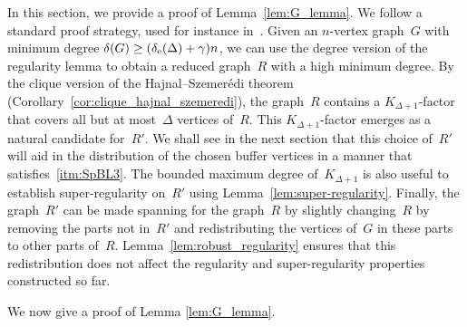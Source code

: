 \documentclass[final]{article}
\theoremstyle{definition}
\newcommand{\exth}{\delta_{\rm e}(\Delta)}
\begin{document}
In this section, we provide a proof of Lemma~\ref{lem:G_lemma}. We follow a standard proof strategy, used for instance in~\cite{dense_bandwidth_theorem}. Given an $n$-vertex graph~$G$ with minimum degree $\delta(G) \geq (\exth + \gamma)n$, we can use the degree version of the regularity lemma to obtain a reduced graph~$R$ with a high minimum degree. By the clique version of the Hajnal--Szemer\'{e}di theorem (Corollary~\ref{cor:clique_hajnal_szemeredi}), the graph~$R$ contains a $K_{\Delta+1}$-factor that covers all but at most~$\Delta$ vertices of~$R$. This $K_{\Delta+1}$-factor emerges as a natural candidate for~$R'$. We shall see in the next section that this choice of~$R'$ will aid in the distribution of the chosen buffer vertices in a manner that satisfies~\ref{itm:SpBL3}. The bounded maximum degree of~$K_{\Delta + 1}$ is also useful to establish super-regularity on~$R'$ using Lemma~\ref{lem:super-regularity}. Finally, the graph~$R'$ can be made spanning for the graph~$R$ by slightly changing~$R$ by removing the parts not in~$R'$ and redistributing the vertices of~$G$ in these parts to other parts of~$R$. Lemma~\ref{lem:robust_regularity} ensures that this redistribution does not affect the regularity and super-regularity properties constructed so far. 

We now give a proof of Lemma \ref{lem:G_lemma}.
\end{document}
